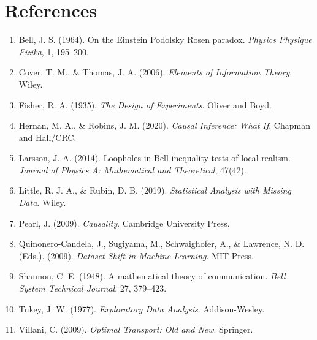 \documentclass[11pt]{article}
\begin{document}
\section*{References}

\begin{enumerate}
\item Bell, J. S. (1964). On the Einstein Podolsky Rosen paradox. \textit{Physics Physique Fizika}, 1, 195--200.

\item Cover, T. M., \& Thomas, J. A. (2006). \textit{Elements of Information Theory}. Wiley.

\item Fisher, R. A. (1935). \textit{The Design of Experiments}. Oliver and Boyd.

\item Hernan, M. A., \& Robins, J. M. (2020). \textit{Causal Inference: What If}. Chapman and Hall/CRC.

\item Larsson, J.-A. (2014). Loopholes in Bell inequality tests of local realism. \textit{Journal of Physics A: Mathematical and Theoretical}, 47(42).

\item Little, R. J. A., \& Rubin, D. B. (2019). \textit{Statistical Analysis with Missing Data}. Wiley.

\item Pearl, J. (2009). \textit{Causality}. Cambridge University Press.

\item Quinonero-Candela, J., Sugiyama, M., Schwaighofer, A., \& Lawrence, N. D. (Eds.). (2009). \textit{Dataset Shift in Machine Learning}. MIT Press.

\item Shannon, C. E. (1948). A mathematical theory of communication. \textit{Bell System Technical Journal}, 27, 379--423.

\item Tukey, J. W. (1977). \textit{Exploratory Data Analysis}. Addison-Wesley.

\item Villani, C. (2009). \textit{Optimal Transport: Old and New}. Springer.
\end{enumerate}
\end{document}
